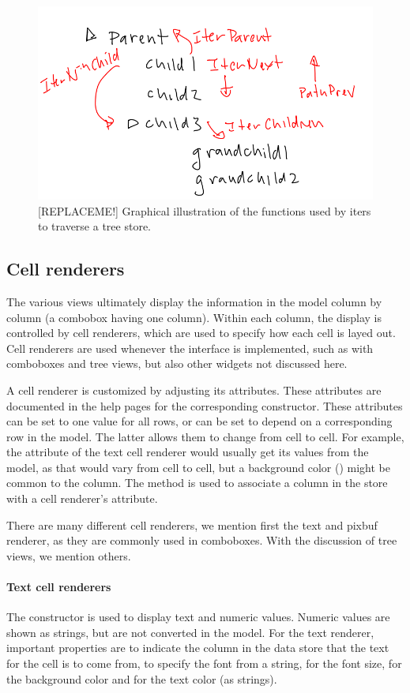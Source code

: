 \begin{figure}
  \includegraphics[width=.7\textwidth]{traverse-tree}
  \caption{[REPLACEME!] Graphical illustration of the functions used by iters to traverse a tree store. }
  \label{fig:traverse-iter}
\end{figure}

\subsection{Cell renderers}
\label{sec:RGtk2:cellrenderers}
The various views ultimately display the information in the model
column by column (a combobox having one column). Within each column,
the display is controlled by cell renderers, which are used to specify
how each cell is layed out. Cell renderers are used whenever the 
 interface is implemented, such as with comboboxes
and tree views, but also other widgets not discussed here.

A cell renderer is customized by adjusting its attributes. These
attributes are documented in the help pages for the corresponding
constructor. These attributes can be set to one value for all rows, or
can be set to depend on a corresponding row in the model. The latter
allows them to change from cell to cell. For example, the 
attribute of the text cell renderer would usually get its values from
the model, as that would vary from cell to cell, but a background
color () might be common to the column. The
 method is used to associate a
column in the store with a cell renderer's attribute.

There are many different cell renderers, we mention first the text and
pixbuf renderer, as they are commonly used in comboboxes. With the
discussion of tree views, we mention others.

\paragraph{Text cell renderers}
The  constructor is used to display
text and numeric values. Numeric values are shown as strings, but are
not converted in the model.  For the text renderer, important
properties are  to indicate the column in the data store
that the text for the cell is to come from,  to specify the
font from a string,  for the font size, 
for the background color and  for the text color (as
strings).

